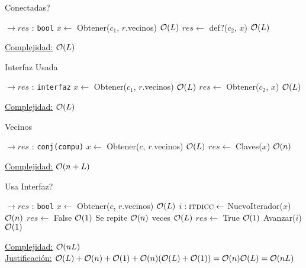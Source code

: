 \begin{Algoritmos}
\begin{algorithm}
\caption{Conectadas?}
\begin{algorithmic}[1]
    $\to res$ : \texttt{bool}
  \State $x \gets$ Obtener($c_1$, $r$.vecinos) \Comment $\mathcal{O}(L)$
  \State $res \gets$ def?($c_2$, $x$) \Comment $\mathcal{O}(L)$
 \EndProcedure
\end{algorithmic}
	 \underline{Complejidad:} $\mathcal{O}(L)$
\end{algorithm}


\begin{algorithm}
\caption{Interfaz Usada}
\begin{algorithmic}[1]
   $\to res$ : \texttt{interfaz}
  \State $x \gets$ Obtener($c_1$, $r$.vecinos) \Comment $\mathcal{O}(L)$
  \State $res \gets$ Obtener($c_2$, $x$) \Comment $\mathcal{O}(L)$
 \EndProcedure
\end{algorithmic}
 \underline{Complejidad:} $\mathcal{O}(L)$
\end{algorithm}


\begin{algorithm}
\caption{Vecinos}
\begin{algorithmic}[1]
    $\to res$ : \texttt{conj(compu)}
  \State $x \gets$ Obtener($c$, $r$.vecinos) \Comment $\mathcal{O}(L)$
  \State $res \gets$ Claves($x$) \Comment $\mathcal{O}(n)$
 \EndProcedure
\end{algorithmic}
 \underline{Complejidad:} $\mathcal{O}(n+L)$
\end{algorithm}



\begin{algorithm}
\caption{Usa Interfaz?}
\begin{algorithmic}[1]
   $\to res$ : \texttt{bool} 
  \State $x \gets$ Obtener($c$, $r$.vecinos) \Comment $\mathcal{O}(L)$
  \State $i :\textsc{itdicc} \gets$ NuevoIterador($x$) \Comment $\mathcal{O}(n)$
  \State $res \gets$ False \Comment $\mathcal{O}(1)$
   \Comment Se repite $\mathcal{O}(n)$ veces
      \Comment $\mathcal{O}(L)$
       \State $res \gets$ True  \Comment $\mathcal{O}(1)$
    \EndIf
    \State Avanzar($i$) \Comment $\mathcal{O}(1)$
  \EndWhile
 \EndProcedure
\end{algorithmic}
 \underline{Complejidad:} $\mathcal{O}(nL)$\\
 \underline{Justificación:} $\mathcal{O}(L) + \mathcal{O}(n) + \mathcal{O}(1) + \mathcal{O}(n)(\mathcal{O}(L) + \mathcal{O}(1)) = \mathcal{O}(n)\mathcal{O}(L) = \mathcal{O}(nL)$
\end{algorithm}



\end{Algoritmos}
